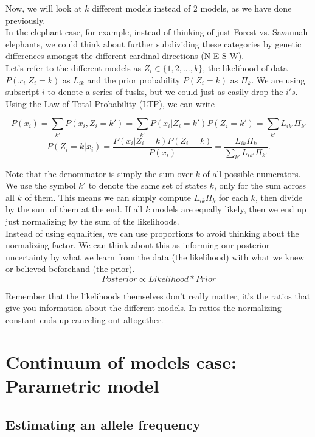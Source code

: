 \documentclass[12pt]{article}
\begin{document}
Now, we will look at $k$ different models instead of 2 models, as we have done previously.\\

In the elephant case, for example, instead of thinking of just Forest vs. Savannah elephants, we could think about further subdividing these categories by genetic differences amongst the different cardinal directions (N E S W). \\

Let's refer to the different models as $Z_i \in \{1,2,...,k\}$, the likelihood of data $P(x_i|Z_i=k)$ as $L_{ik}$ and the prior probability $P(Z_i=k)$ as $\Pi_k$. We are using subscript $i$ to denote a series of tusks, but we could just as easily drop the $i's$.\\

Using the Law of Total Probability (LTP), we can write

\[
P(x_i) = \sum_{k'} P(x_i,Z_i=k') = \sum_{k'} P(x_i | Z_i=k') P(Z_i = k') = \sum_{k'} L_{ik'} \Pi_{k'}
\]
\[
P(Z_i=k|x_i) = \frac{P(x_i|Z_i=k)P(Z_i=k)}{P(x_i)} = \frac{L_{ik}\Pi_k}{\sum_{k'} L_{ik'} \Pi_{k'}}.
\]

Note that the denominator is simply the sum over $k$ of all possible numerators. We use the symbol $k'$ to denote the same set of states $k$, only for the sum across all $k$ of them. This means we can simply compute $L_{ik}\Pi_k$ for each $k$, then divide by the sum of them at the end. If all $k$ models are equally likely, then we end up just normalizing by the sum of the likelihoods.\\

Instead of using equalities, we can use proportions to avoid thinking about the normalizing factor. We can think about this as informing our posterior uncertainty by what we learn from the data (the likelihood) with what we knew or believed beforehand (the prior).
\[
Posterior \propto Likelihood * Prior
\]

Remember that the likelihoods themselves don't really matter, it's the ratios that give you information about the different models. In ratios the normalizing constant ends up canceling out altogether.

\section{Continuum of models case: Parametric model}
\subsection{Estimating an allele frequency}
\end{document}
